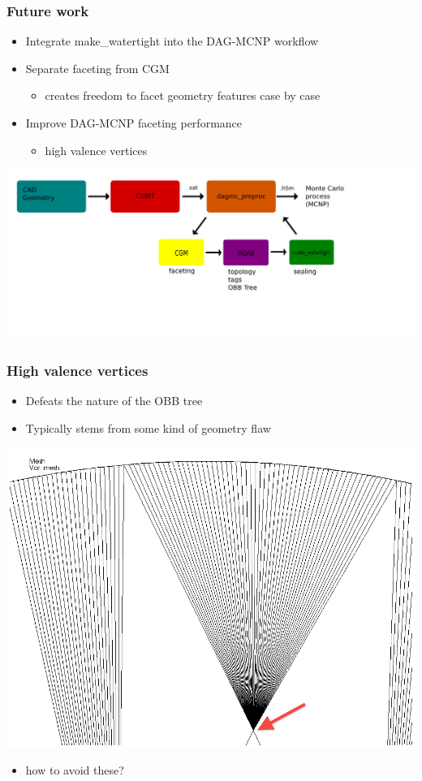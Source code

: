 \documentclass[14pt]{beamer}
\begin{document}
\begin{frame}
\frametitle{Future work}
\begin{itemize}
\item Integrate make\_watertight into the DAG-MCNP workflow
\item Separate faceting from CGM
	\begin{itemize}
	\item creates freedom to facet geometry features case by case
	\end{itemize}
\item Improve DAG-MCNP faceting performance
	\begin{itemize}
	\item high valence vertices
	\end{itemize}
\end{itemize}
\includegraphics[scale=0.25, trim = 0 200 0 0 ]{DAGMC_Wrkflw7.png}
\end{frame}



\begin{frame}
\frametitle{High valence vertices}
\begin{itemize}
\item Defeats the nature of the OBB tree
\item Typically stems from some kind of geometry flaw
\end{itemize}
\begin{center}
\includegraphics[scale=0.26]{high_valence_vert.png}
\end{center}
\begin{itemize}
\item how to avoid these?
\end{itemize}
\end{frame}
\end{document}
